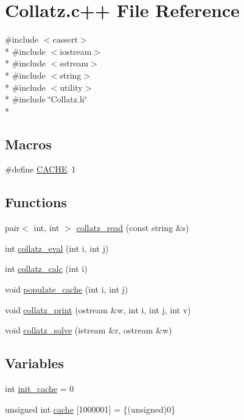 \hypertarget{Collatz_8c_09_09}{\section{Collatz.\-c++ File Reference}
\label{Collatz_8c_09_09}
}
{\ttfamily \#include $<$cassert$>$}\\*
{\ttfamily \#include $<$iostream$>$}\\*
{\ttfamily \#include $<$sstream$>$}\\*
{\ttfamily \#include $<$string$>$}\\*
{\ttfamily \#include $<$utility$>$}\\*
{\ttfamily \#include \char`\"{}Collatz.\-h\char`\"{}}\\*
\subsection*{Macros}
\begin{DoxyCompactItemize}
\item 
\#define \hyperlink{Collatz_8c_09_09_a43fd55aa78bd891ebbd6a450f5eecce4}{C\-A\-C\-H\-E}~1
\end{DoxyCompactItemize}
\subsection*{Functions}
\begin{DoxyCompactItemize}
\item 
pair$<$ int, int $>$ \hyperlink{Collatz_8c_09_09_aeb2edb6ee16627fa3682f57c7cbf3662}{collatz\-\_\-read} (const string \&s)
\item 
int \hyperlink{Collatz_8c_09_09_a0b0d3827a619c18aa4d96b8ee8b1c47d}{collatz\-\_\-eval} (int i, int j)
\item 
int \hyperlink{Collatz_8c_09_09_aacecd38aa338cae7ec4cc36760638340}{collatz\-\_\-calc} (int i)
\item 
void \hyperlink{Collatz_8c_09_09_a9cd08b4656005090241088ed114e3f11}{populate\-\_\-cache} (int i, int j)
\item 
void \hyperlink{Collatz_8c_09_09_aeda0b7ea3e40e1e7487ccc436f33a559}{collatz\-\_\-print} (ostream \&w, int i, int j, int v)
\item 
void \hyperlink{Collatz_8c_09_09_a0ac646d2122741f9a9a52201bf9551cc}{collatz\-\_\-solve} (istream \&r, ostream \&w)
\end{DoxyCompactItemize}
\subsection*{Variables}
\begin{DoxyCompactItemize}
\item 
int \hyperlink{Collatz_8c_09_09_a4aec11a6e1b7cdca65df7232bfecb3de}{init\-\_\-cache} = 0
\item 
unsigned int \hyperlink{Collatz_8c_09_09_a117b8639e485388b199bd815b5490f1e}{cache} \mbox{[}1000001\mbox{]} = \{(unsigned)0\}
\end{DoxyCompactItemize}


